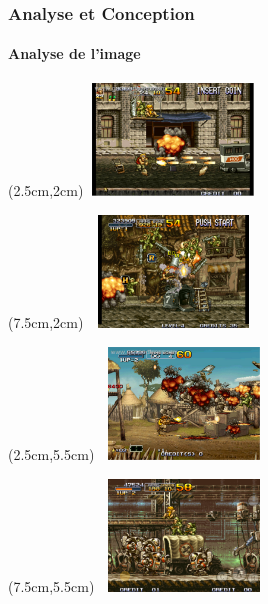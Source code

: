 \begin{frame}

	\frametitle{Analyse et Conception}
	\framesubtitle{Analyse de l'image}

	\begin{textblock*}{4.5cm}(2.5cm,2cm)
		\includegraphics[width=4.5cm,height=3cm]{figures/screen_jeuorigine_1.jpg}
	\end{textblock*}

	\begin{textblock*}{4.5cm}(7.5cm,2cm)
		\includegraphics[width=4.5cm,height=3cm]{figures/screen_jeuorigine_2.jpg}
	\end{textblock*}

	\begin{textblock*}{4.5cm}(2.5cm,5.5cm)
		\includegraphics[width=4.5cm,height=3cm]{figures/screen_jeuorigine_3.jpg}
	\end{textblock*}

	\begin{textblock*}{4.5cm}(7.5cm,5.5cm)
		\includegraphics[width=4.5cm,height=3cm]{figures/screen_jeuorigine_4.png}
	\end{textblock*}

\end{frame}
